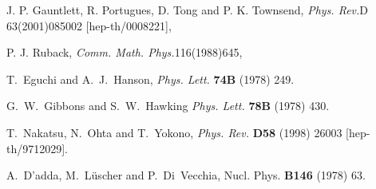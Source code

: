\documentclass[a4paper,12pt]{article}
\begin{document}
\begin{thebibliography}{100}
J. P. Gauntlett, R. Portugues, D. Tong and P. K. Townsend,
              {\em Phys. Rev.}{D 63}(2001)085002
              [hep-th/0008221],

P. J. Ruback,
              {\em Comm. Math. Phys.}{116}(1988)645,



T.~Eguchi and A.~J.~Hanson, 
{\em Phys. Lett.} {\bf 74B} (1978) 249. 

G.~W.~Gibbons and S.~W.~Hawking
{\em Phys. Lett.} {\bf 78B} (1978) 430. 

T.~Nakatsu, N.~Ohta and T.~Yokono,  
{\em Phys. Rev.} {\bf D58} (1998) 26003 
[hep-th/9712029]. 
%

A.~D'adda, M.~L\"{u}scher and 
P.~Di~Vecchia, 
Nucl. Phys. {\bf B146} (1978) 63.


\end{thebibliography}
\end{document}
